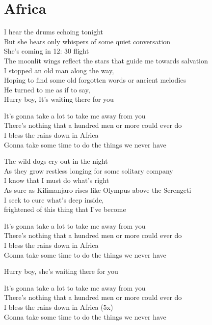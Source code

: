 \section{Africa}
I hear the drums echoing tonight\\
But she hears only whispers of some quiet conversation\\
She's coming in 12: 30 flight\\
The moonlit wings reflect the stars that guide me towards salvation\\
I stopped an old man along the way,\\
Hoping to find some old forgotten words or ancient melodies\\
He turned to me as if to say,\\
Hurry boy, It's waiting there for you

It's gonna take a lot to take me away from you\\
There's nothing that a hundred men or more could ever do\\
I bless the rains down in Africa\\
Gonna take some time to do the things we never have

The wild dogs cry out in the night\\
As they grow restless longing for some solitary company\\
I know that I must do what's right\\
As sure as Kilimanjaro rises like Olympus above the Serengeti\\
I seek to cure what's deep inside,\\
frightened of this thing that I've become

It's gonna take a lot to take me away from you\\
There's nothing that a hundred men or more could ever do\\
I bless the rains down in Africa\\
Gonna take some time to do the things we never have

Hurry boy, she's waiting there for you

It's gonna take a lot to take me away from you\\
There's nothing that a hundred men or more could ever do\\
I bless the rains down in Africa (5x)\\
Gonna take some time to do the things we never have
